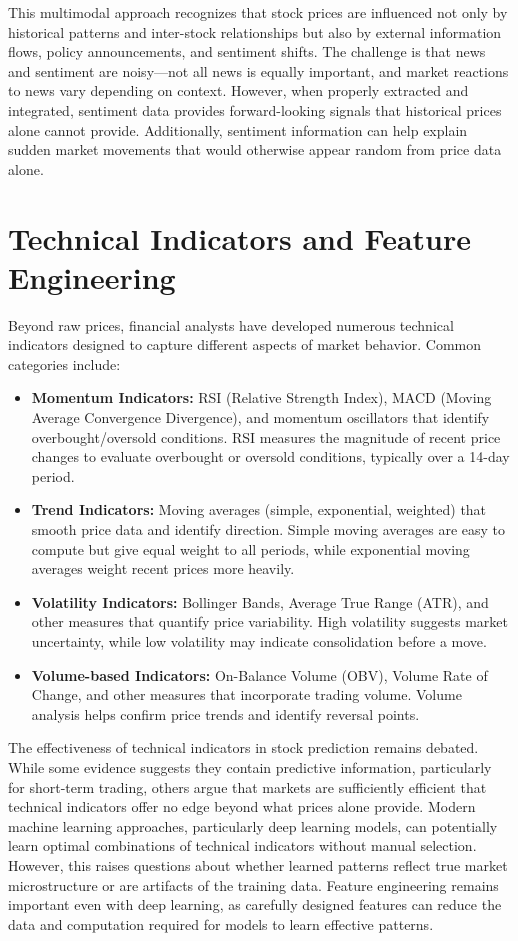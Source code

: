 This multimodal approach recognizes that stock prices are influenced not only by historical patterns and inter-stock relationships but also by external information flows, policy announcements, and sentiment shifts. The challenge is that news and sentiment are noisy—not all news is equally important, and market reactions to news vary depending on context. However, when properly extracted and integrated, sentiment data provides forward-looking signals that historical prices alone cannot provide. Additionally, sentiment information can help explain sudden market movements that would otherwise appear random from price data alone.

\section{Technical Indicators and Feature Engineering}

Beyond raw prices, financial analysts have developed numerous technical indicators designed to capture different aspects of market behavior. Common categories include:

\begin{itemize}
    \item \textbf{Momentum Indicators:} RSI (Relative Strength Index), MACD (Moving Average Convergence Divergence), and momentum oscillators that identify overbought/oversold conditions. RSI measures the magnitude of recent price changes to evaluate overbought or oversold conditions, typically over a 14-day period.
    \item \textbf{Trend Indicators:} Moving averages (simple, exponential, weighted) that smooth price data and identify direction. Simple moving averages are easy to compute but give equal weight to all periods, while exponential moving averages weight recent prices more heavily.
    \item \textbf{Volatility Indicators:} Bollinger Bands, Average True Range (ATR), and other measures that quantify price variability. High volatility suggests market uncertainty, while low volatility may indicate consolidation before a move.
    \item \textbf{Volume-based Indicators:} On-Balance Volume (OBV), Volume Rate of Change, and other measures that incorporate trading volume. Volume analysis helps confirm price trends and identify reversal points.
\end{itemize}

The effectiveness of technical indicators in stock prediction remains debated. While some evidence suggests they contain predictive information, particularly for short-term trading, others argue that markets are sufficiently efficient that technical indicators offer no edge beyond what prices alone provide. Modern machine learning approaches, particularly deep learning models, can potentially learn optimal combinations of technical indicators without manual selection. However, this raises questions about whether learned patterns reflect true market microstructure or are artifacts of the training data. Feature engineering remains important even with deep learning, as carefully designed features can reduce the data and computation required for models to learn effective patterns.

